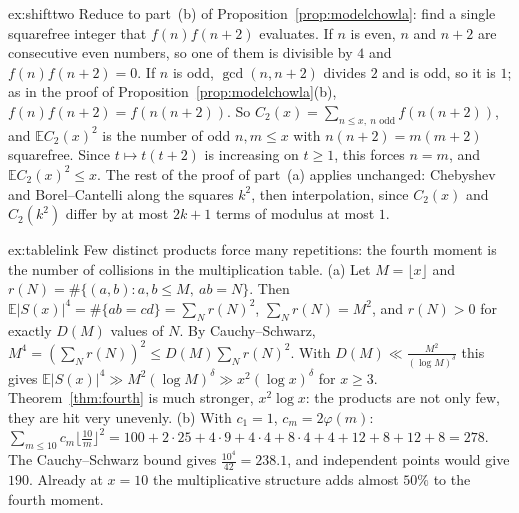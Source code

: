 \begin{solution}{ex:shifttwo}
\idea Reduce to part~(b) of Proposition~\ref{prop:modelchowla}: find a single squarefree integer that $f(n)f(n+2)$ evaluates.
\writeup If $n$ is even, $n$ and $n+2$ are consecutive even numbers, so one of them is divisible by $4$ and $f(n)f(n+2)=0$. If $n$ is odd, $\gcd(n,n+2)$ divides $2$ and is odd, so it is $1$; as in the proof of Proposition~\ref{prop:modelchowla}(b), $f(n)f(n+2)=f(n(n+2))$. So $C_2(x)=\sum_{n\le x,\ n\text{ odd}}f(n(n+2))$, and $\mathbb EC_2(x)^2$ is the number of odd $n,m\le x$ with $n(n+2)=m(m+2)$ squarefree. Since $t\mapsto t(t+2)$ is increasing on $t\ge1$, this forces $n=m$, and $\mathbb EC_2(x)^2\le x$. The rest of the proof of part~(a) applies unchanged: Chebyshev and Borel--Cantelli along the squares $k^2$, then interpolation, since $C_2(x)$ and $C_2(k^2)$ differ by at most $2k+1$ terms of modulus at most $1$.
\end{solution}

\begin{solution}{ex:tablelink}
\idea Few distinct products force many repetitions: the fourth moment is the number of collisions in the multiplication table.
\writeup (a) Let $M=\lfloor x\rfloor$ and $r(N)=\#\{(a,b):a,b\le M,\ ab=N\}$. Then $\mathbb E|S(x)|^4=\#\{ab=cd\}=\sum_Nr(N)^2$, $\sum_Nr(N)=M^2$, and $r(N)>0$ for exactly $D(M)$ values of $N$. By Cauchy--Schwarz, $M^4=(\sum_Nr(N))^2\le D(M)\sum_Nr(N)^2$. With $D(M)\ll\frac{M^2}{(\log M)^\delta}$ this gives $\mathbb E|S(x)|^4\gg M^2(\log M)^\delta\gg x^2(\log x)^\delta$ for $x\ge3$. Theorem~\ref{thm:fourth} is much stronger, $x^2\log x$: the products are not only few, they are hit very unevenly. (b) With $c_1=1$, $c_m=2\varphi(m)$: $\sum_{m\le10}c_m\lfloor\frac{10}m\rfloor^2=100+2\cdot25+4\cdot9+4\cdot4+8\cdot4+4+12+8+12+8=278$. The Cauchy--Schwarz bound gives $\frac{10^4}{42}=238.1$, and independent points would give $190$. Already at $x=10$ the multiplicative structure adds almost $50\%$ to the fourth moment.
\end{solution}

